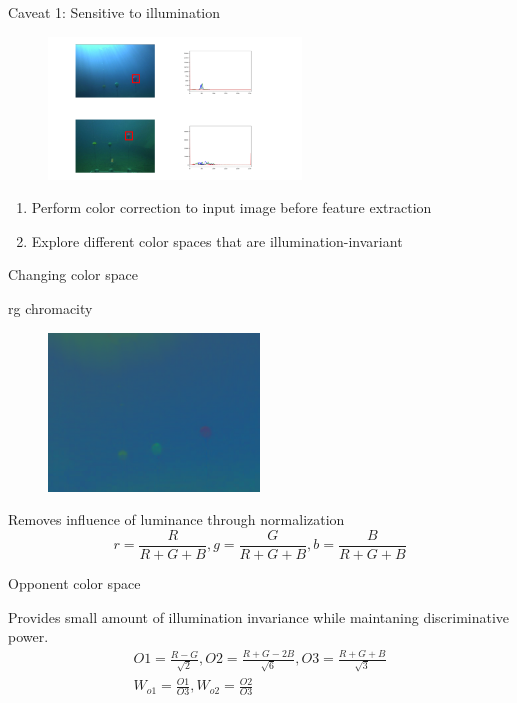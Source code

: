 \documentclass[14pt]{beamer}
\begin{document}
\begin{frame}{Caveat 1: Sensitive to illumination}

  \begin{figure}[ht]
      \centering
      \includegraphics[width=0.6\textwidth, height=0.3\textwidth]{figs/illumsensitive.png}
  \end{figure}

  \begin{enumerate}
    \item Perform color correction to input image before feature extraction
    \item Explore different color spaces that are illumination-invariant
  \end{enumerate}

\end{frame}

\begin{frame}[standout]{}
  Changing color space
\end{frame}

\begin{frame}{rg chromacity}

  \begin{figure}[ht]
      \centering
      \includegraphics[width=0.5\textwidth, height=0.3\textwidth]{figs/rg.png}
  \end{figure}

  Removes influence of luminance through normalization 
  \[
    r = \frac{R}{R + G + B}, g = \frac{G}{R + G + B}, b = \frac{B}{R + G + B}
  \]
\end{frame}

\begin{frame}{Opponent color space}

  Provides small amount of illumination invariance while maintaning
  discriminative power.
  \[
  \begin{aligned}
    O1 = \frac{R - G}{\sqrt{2}}, O2 = \frac{R + G - 2B}{\sqrt{6}}, O3 = \frac{R +
      G + B}{\sqrt{3}} \\
    W_{o1} = \frac{O1}{O3}, W_{o2} = \frac{O2}{O3}
  \end{aligned}
  \]
\end{frame}
\end{document}

